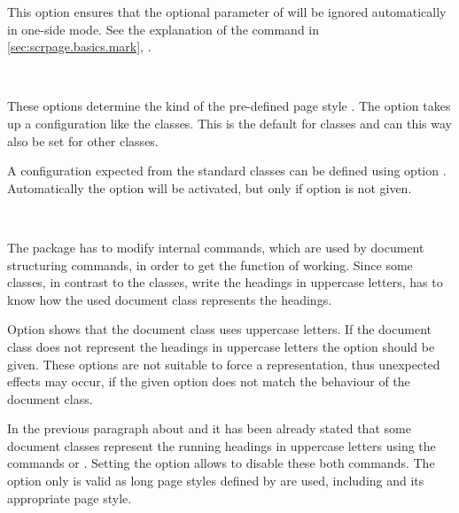 \begin{Declaration}
\end{Declaration}%
This option ensures that the optional parameter of
 will be ignored automatically
in one-side mode. See the explanation of the command
 in \autoref{sec:scrpage.basics.mark},
.

\begin{Declaration}
\\
\end{Declaration}%
These options determine the kind of the pre-defined page style
.
The option  takes up a configuration like
the \KOMAScript{} classes.
This is the default for \KOMAScript{} classes and can this way
also be set for other classes.

A configuration expected from the standard classes can be
defined using option .
Automatically the option  will be
activated, but only if option  is not given.

\begin{Declaration}
\\
\end{Declaration}%
The package  has
to modify internal commands, which are used by document structuring
commands, in order to get the function of  working.
Since some classes, in contrast to the \KOMAScript{} classes,
write the headings in uppercase letters, 
has to know how the used document class represents the headings.

Option  shows  that
the document class uses uppercase letters.
If the document class does not represent the headings in
uppercase letters the option  should
be given.
These options are not suitable to force a representation, thus
unexpected effects may occur, if the given option does not match
the behaviour of the document class.

\begin{Declaration}
\end{Declaration}%
%
In the previous paragraph about  and
 it has been already stated that some
document classes represent the running headings in
uppercase letters using the commands
 or .
Setting the option  allows to disable these
both commands.
The option  only is valid as long page styles
defined by  are used, including
 and its appropriate  page style.

